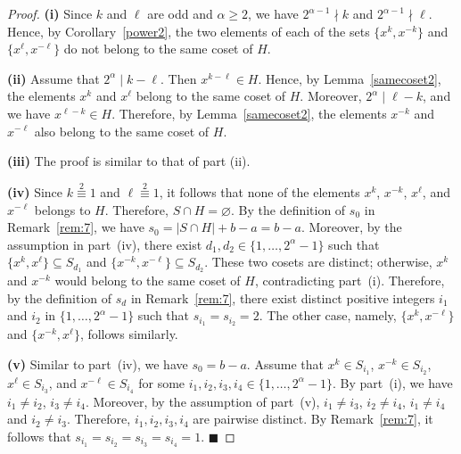 \documentclass[12pt]{article}
\begin{document}
  \begin{proof}
\textbf{(i)} Since $k$ and $\ell$ are odd and $\alpha\ge2$, we have $2^{\alpha-1}\nmid k$ and $2^{\alpha-1}\nmid\ell$. Hence, by Corollary~\ref{power2}, the two elements of each of the sets $\{x^k,x^{-k}\}$ and $\{x^\ell,x^{-\ell}\}$ do not belong to the same coset of $H$.  	
  	
\textbf{(ii)} Assume that $2^\alpha\mid k-\ell$. Then $x^{k-\ell}\in H$. Hence, by Lemma~\ref{samecoset2}, the elements $x^k$ and $x^\ell$ belong to the same coset of $H$. Moreover, $2^\alpha\mid \ell-k$, and we have $x^{\ell-k}\in H$. Therefore, by Lemma~\ref{samecoset2}, the elements $x^{-k}$ and $x^{-\ell}$ also belong to the same coset of $H$.  	

\textbf{(iii)} The proof is similar to that of part (ii).

\textbf{(iv)} Since $k\stackrel{2}{\equiv}1$ and $\ell\stackrel{2}{\equiv}1$, it follows that none of the elements $x^k$, $x^{-k}$, $x^\ell$, and $x^{-\ell}$ belongs to $H$. Therefore, $S\cap H=\varnothing$. By the definition of $s_0$ in Remark~\ref{rem:7}, we have $s_0=|S\cap H|+b-a=b-a$.
Moreover, by the assumption in part~(iv), there exist $d_1,d_2\in\{1,\ldots,2^\alpha-1\}$ such that
$
\{x^k,x^\ell\}\subseteq S_{d_1}
$
and
$
\{x^{-k},x^{-\ell}\}\subseteq S_{d_2}.
$
These two cosets are distinct; otherwise, $x^k$ and $x^{-k}$ would belong to the same coset of $H$, contradicting part~(i). Therefore, by the definition of $s_d$ in Remark~\ref{rem:7}, there exist distinct positive integers $i_1$ and $i_2$ in $\{1,\ldots,2^\alpha-1\}$ such that $s_{i_1}=s_{i_2}=2$. The other case, namely, $\{x^k,x^{-\ell}\}$ and $\{x^{-k},x^\ell\}$, follows similarly.

\textbf{(v)} Similar to part~(iv), we have $s_0=b-a$. Assume that $x^k\in S_{i_1}$, $x^{-k}\in S_{i_2}$, $x^\ell\in S_{i_3}$, and $x^{-\ell}\in S_{i_4}$ for some $i_1,i_2,i_3,i_4\in\{1,\ldots,2^\alpha-1\}$. By part~(i), we have $i_1\neq i_2$, $i_3\neq i_4$. Moreover, by the assumption of part~(v), $i_1\neq i_3$, $i_2\neq i_4$, $i_1\neq i_4$ and $i_2\neq i_3$. Therefore, $i_1,i_2,i_3,i_4$ are pairwise distinct. By Remark~\ref{rem:7}, it follows that $s_{i_1}=s_{i_2}=s_{i_3}=s_{i_4}=1$. \hfill$\blacksquare$	
  	\end{proof}
\end{document}
